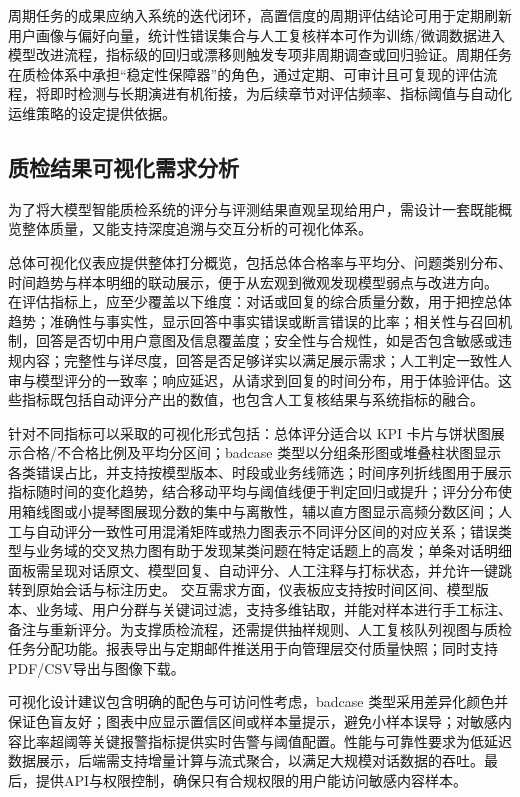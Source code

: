 周期任务的成果应纳入系统的迭代闭环，高置信度的周期评估结论可用于定期刷新用户画像与偏好向量，统计性错误集合与人工复核样本可作为训练/微调数据进入模型改进流程，指标级的回归或漂移则触发专项非周期调查或回归验证。周期任务在质检体系中承担“稳定性保障器”的角色，通过定期、可审计且可复现的评估流程，将即时检测与长期演进有机衔接，为后续章节对评估频率、指标阈值与自动化运维策略的设定提供依据。

\subsection{质检结果可视化需求分析}
为了将大模型智能质检系统的评分与评测结果直观呈现给用户，需设计一套既能概览整体质量，又能支持深度追溯与交互分析的可视化体系。

总体可视化仪表应提供整体打分概览，包括总体合格率与平均分、问题类别分布、时间趋势与样本明细的联动展示，便于从宏观到微观发现模型弱点与改进方向。 在评估指标上，应至少覆盖以下维度：对话或回复的综合质量分数，用于把控总体趋势；准确性与事实性，显示回答中事实错误或断言错误的比率；相关性与召回机制，回答是否切中用户意图及信息覆盖度；安全性与合规性，如是否包含敏感或违规内容；完整性与详尽度，回答是否足够详实以满足展示需求；人工判定一致性人审与模型评分的一致率；响应延迟，从请求到回复的时间分布，用于体验评估。这些指标既包括自动评分产出的数值，也包含人工复核结果与系统指标的融合。 

针对不同指标可以采取的可视化形式包括：总体评分适合以 KPI 卡片与饼状图展示合格/不合格比例及平均分区间；badcase 类型以分组条形图或堆叠柱状图显示各类错误占比，并支持按模型版本、时段或业务线筛选；时间序列折线图用于展示指标随时间的变化趋势，结合移动平均与阈值线便于判定回归或提升；评分分布使用箱线图或小提琴图展现分数的集中与离散性，辅以直方图显示高频分数区间；人工与自动评分一致性可用混淆矩阵或热力图表示不同评分区间的对应关系；错误类型与业务域的交叉热力图有助于发现某类问题在特定话题上的高发；单条对话明细面板需呈现对话原文、模型回复、自动评分、人工注释与打标状态，并允许一键跳转到原始会话与标注历史。 交互需求方面，仪表板应支持按时间区间、模型版本、业务域、用户分群与关键词过滤，支持多维钻取，并能对样本进行手工标注、备注与重新评分。为支撑质检流程，还需提供抽样规则、人工复核队列视图与质检任务分配功能。报表导出与定期邮件推送用于向管理层交付质量快照；同时支持 PDF/CSV导出与图像下载。

可视化设计建议包含明确的配色与可访问性考虑，badcase 类型采用差异化颜色并保证色盲友好；图表中应显示置信区间或样本量提示，避免小样本误导；对敏感内容比率超阈等关键报警指标提供实时告警与阈值配置。性能与可靠性要求为低延迟数据展示，后端需支持增量计算与流式聚合，以满足大规模对话数据的吞吐。最后，提供API与权限控制，确保只有合规权限的用户能访问敏感内容样本。

